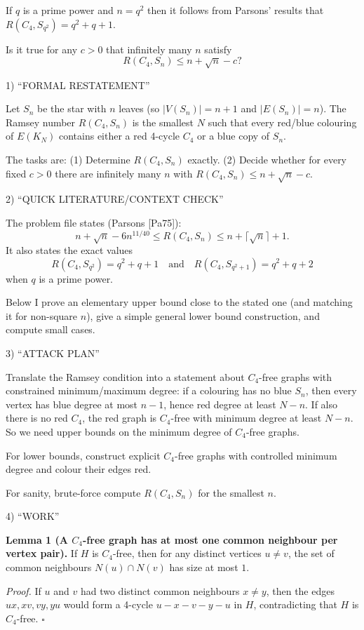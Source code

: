 If $q$ is a prime power and $n=q^2$ then it follows from Parsons' results that $R(C_4,S_{q^2})=q^2+q+1$.

Is it true for any $c>0$ that infinitely many $n$ satisfy 
\[
R(C_4,S_n)\leq n+\sqrt{n}-c?
\]

1) “FORMAL RESTATEMENT”

Let $S_n$ be the star with $n$ leaves (so $|V(S_n)|=n+1$ and $|E(S_n)|=n$). The Ramsey number $R(C_4,S_n)$ is the smallest $N$ such that every red/blue colouring of $E(K_N)$ contains either a red 4-cycle $C_4$ or a blue copy of $S_n$.

The tasks are:
(1) Determine $R(C_4,S_n)$ exactly.
(2) Decide whether for every fixed $c>0$ there are infinitely many $n$ with $R(C_4,S_n)\le n+\sqrt n - c$.

2) “QUICK LITERATURE/CONTEXT CHECK”

The problem file states (Parsons [Pa75]):
\[
n+\sqrt{n}-6n^{11/40}\leq R(C_4,S_n)\leq n+\lceil\sqrt{n}\rceil+1.
\]
It also states the exact values
\[
R(C_4,S_{q^2})=q^2+q+1\quad\text{and}\quad R(C_4,S_{q^2+1})=q^2+q+2
\]
when $q$ is a prime power.

Below I prove an elementary upper bound close to the stated one (and matching it for non-square $n$), give a simple general lower bound construction, and compute small cases.

3) “ATTACK PLAN”

Translate the Ramsey condition into a statement about $C_4$-free graphs with constrained minimum/maximum degree: if a colouring has no blue $S_n$, then every vertex has blue degree at most $n-1$, hence red degree at least $N-n$. If also there is no red $C_4$, the red graph is $C_4$-free with minimum degree at least $N-n$. So we need upper bounds on the minimum degree of $C_4$-free graphs.

For lower bounds, construct explicit $C_4$-free graphs with controlled minimum degree and colour their edges red.

For sanity, brute-force compute $R(C_4,S_n)$ for the smallest $n$.

4) “WORK”

\textbf{Lemma 1 (A $C_4$-free graph has at most one common neighbour per vertex pair).}
If $H$ is $C_4$-free, then for any distinct vertices $u\neq v$, the set of common neighbours $N(u)\cap N(v)$ has size at most $1$.

\emph{Proof.}
If $u$ and $v$ had two distinct common neighbours $x\neq y$, then the edges $ux,xv,vy,yu$ would form a 4-cycle $u-x-v-y-u$ in $H$, contradicting that $H$ is $C_4$-free. $\square$

